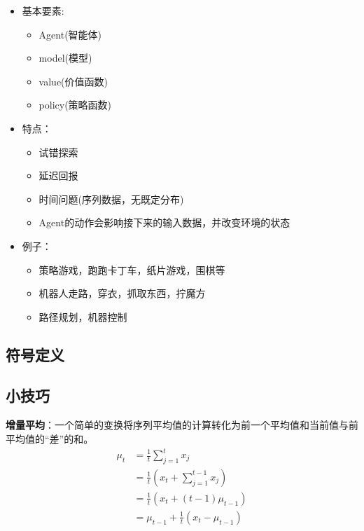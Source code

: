 \documentclass[UTF8]{ctexart}
\begin{document}
\begin{itemize}

    \item 基本要素:
    \begin{itemize}
        \item Agent(智能体)
        \item model(模型)
        \item value(价值函数)
        \item policy(策略函数)
    \end{itemize}

    \item 特点：
    \begin{itemize}
        \item 试错探索
        \item 延迟回报
        \item 时间问题(序列数据，无既定分布)
        \item Agent的动作会影响接下来的输入数据，并改变环境的状态
    \end{itemize}
    \item 例子：

    \begin{itemize}
        \item 策略游戏，跑跑卡丁车，纸片游戏，围棋等
        \item 机器人走路，穿衣，抓取东西，拧魔方
        \item 路径规划，机器控制
    \end{itemize}
    
\end{itemize}


\subsection{符号定义}
\subsection{小技巧}
\label{sub:smalltricks}
\textbf{增量平均}：一个简单的变换将序列平均值的计算转化为前一个平均值和当前值与前平均值的“差”的和。
\begin{equation} \label{Incremental:Mean}
    \begin{aligned}
    \mu_{t} &=\frac{1}{t} \sum_{j=1}^{t} x_{j} \\
    &=\frac{1}{t}\left(x_{t}+\sum_{j=1}^{t-1} x_{j}\right) \\
    &=\frac{1}{t}\left(x_{t}+(t-1) \mu_{t-1}\right) \\
    &=\mu_{t-1}+\frac{1}{t}\left(x_{t}-\mu_{t-1}\right)
    \end{aligned} 
\end{equation}
\end{document}
